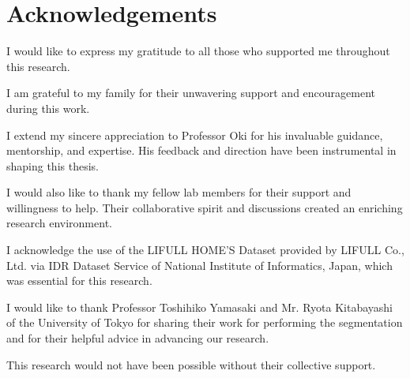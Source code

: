 \chapter*{Acknowledgements} %
I would like to express my gratitude to all those who supported me throughout this research.

I am grateful to my family for their unwavering support and encouragement during this work.

I extend my sincere appreciation to Professor Oki for his invaluable guidance, mentorship, and expertise. His feedback and direction have been instrumental in shaping this thesis.

I would also like to thank my fellow lab members for their support and willingness to help. Their collaborative spirit and discussions created an enriching research environment.

I acknowledge the use of the LIFULL HOME'S Dataset provided by LIFULL Co., Ltd. via IDR Dataset Service of 
National Institute of Informatics, Japan, which was essential for this research.

I would like to thank Professor Toshihiko Yamasaki and Mr. Ryota Kitabayashi of the University of Tokyo for 
sharing their work for performing the segmentation and for their helpful advice in advancing our research.

This research would not have been possible without their collective support.
